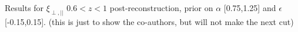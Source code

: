 \label{fig:HDA_z60_alpha0.25_epsilon0.15} Results for $\xi_{\perp, ||}$ $0.6<z<1$ post-reconstruction, prior on $\alpha$ [0.75,1.25] and $\epsilon$ [-0.15,0.15]. (this is just to show the co-authors, but will not make the next cut)